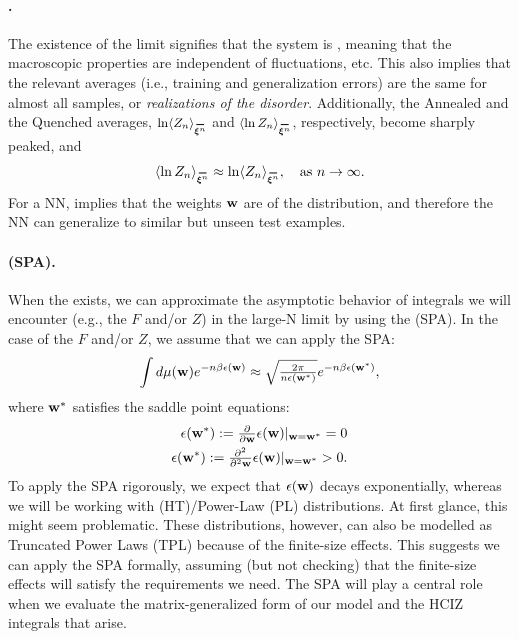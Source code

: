 {\paragraph{\SelfAveraging.}
The existence of the limit signifies that the system is \emph{\SelfAveraging}, meaning that
the macroscopic properties are independent of fluctuations, etc.
This also implies that the relevant averages
(i.e., training and generalization errors) are the same for almost all samples, or \emph{realizations of the disorder}.
Additionally, the Annealed and the Quenched averages,
$\ln \langle Z_n \rangle_{\AVGNDXIn}$ and $\langle \ln Z_n \rangle_{\AVGNDXIn}$, respectively,
become sharply peaked, and
\begin{align}
\langle \ln Z_n \rangle_{\AVGNDXIn} \approx \ln \langle Z_n \rangle_{\AVGNDXIn}, \quad \text{as } n \to \infty .
\end{align}
For a NN, \SelfAveraging implies that the weights ${\mathbf{w}}$ are \emph{\Typical} of the distribution,
and therefore the NN can generalize to similar but unseen test examples.

\paragraph{\SaddlePointApproximation (SPA).}
When the \ThermodynamicLimit exists, we can approximate the asymptotic behavior of integrals we will encounter (e.g., the \FreeEnergy $F$ and/or \PartitionFunction $Z$) in the large-N limit by using the \SaddlePointApproximation (SPA).
In the case of the $F$ and/or $Z$, we assume that we can apply the SPA:
\begin{align}
  \label{eqn:SPA}
  \int d\mu({\mathbf{w}}) e^{-n\beta\epsilon({\mathbf{w}})}\approx \sqrt{\tfrac{2\pi}{n\epsilon({\mathbf{w}}^{*})}} e^{-n\beta\epsilon({\mathbf{w}}^{*})}  ,
\end{align}
where ${\mathbf{w}}^{*}$ satisfies the saddle point equations:
\begin{align}
  \epsilon({\mathbf{w}}^{*}):=\tfrac{\partial}{\partial {\mathbf{w}}}\epsilon({\mathbf{w}})\vert_{{\mathbf{w}}={\mathbf{w}}^{*}}=0 \\
  \epsilon({\mathbf{w}}^{*}):=\tfrac{\partial^{2}}{\partial^{2} {\mathbf{w}}}\epsilon({\mathbf{w}})\vert_{{\mathbf{w}}={\mathbf{w}}^{*}}>0  .
\end{align}
To apply the SPA rigorously, we expect that $\epsilon({\mathbf{w}})$ decays exponentially,
whereas we will be working with \HeavyTailed (HT)/Power-Law (PL) distributions.
At first glance, this might seem problematic.
These distributions, however, can also be modelled as Truncated Power Laws (TPL) because of the finite-size effects. 
This suggests we can apply the SPA formally, assuming (but not checking) that the finite-size effects will satisfy the requirements we need.
The SPA will play a central role when we evaluate the matrix-generalized form of our model and the HCIZ integrals that arise.

}
